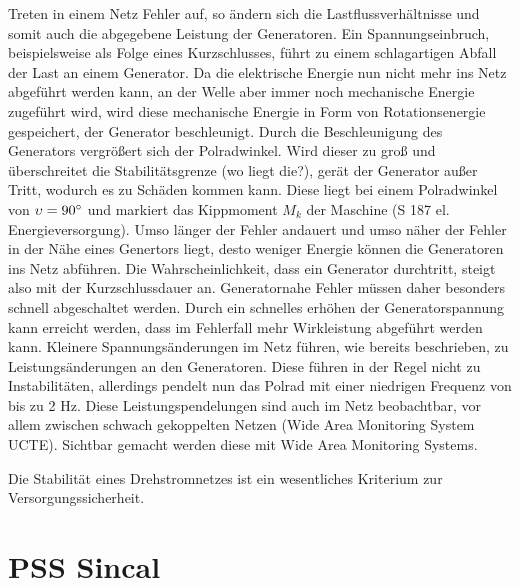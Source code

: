 \documentclass{scrartcl}
\begin{document}
\begin{onehalfspace}
Treten in einem Netz Fehler auf, so ändern sich die Lastflussverhältnisse und somit auch die abgegebene Leistung der Generatoren. Ein Spannungseinbruch, beispielsweise als Folge eines Kurzschlusses, führt zu einem schlagartigen Abfall der Last an einem Generator. Da die elektrische Energie nun nicht mehr ins Netz abgeführt werden kann, an der Welle aber immer noch mechanische Energie zugeführt wird, wird diese mechanische Energie in Form von Rotationsenergie gespeichert, der Generator beschleunigt. Durch die Beschleunigung des Generators vergrößert sich der Polradwinkel. Wird dieser zu groß und überschreitet die Stabilitätsgrenze (wo liegt die?), gerät der Generator \glqq außer Tritt\grqq, wodurch es zu Schäden kommen kann. Diese liegt bei einem Polradwinkel von $\upsilon = 90\degree$ und markiert das Kippmoment $M_k$ der Maschine (S 187 el. Energieversorgung). Umso länger der Fehler andauert und umso näher der Fehler in der Nähe eines Genertors liegt, desto weniger Energie können die Generatoren ins Netz abführen. Die Wahrscheinlichkeit, dass ein Generator \glqq durchtritt\grqq, steigt also mit der Kurzschlussdauer an. Generatornahe Fehler müssen daher besonders schnell abgeschaltet werden. Durch ein schnelles erhöhen der Generatorspannung kann erreicht werden, dass im Fehlerfall mehr Wirkleistung abgeführt werden kann. Kleinere Spannungsänderungen im Netz führen, wie bereits beschrieben, zu Leistungsänderungen an den Generatoren. Diese führen in der Regel nicht zu Instabilitäten, allerdings pendelt nun das Polrad mit einer niedrigen Frequenz von bis zu 2 Hz. Diese Leistungspendelungen sind auch im Netz beobachtbar, vor allem zwischen schwach gekoppelten Netzen (Wide Area Monitoring System UCTE). Sichtbar gemacht werden diese mit Wide Area Monitoring Systems.

Die Stabilität eines Drehstromnetzes ist ein wesentliches Kriterium zur Versorgungssicherheit.



\section{PSS Sincal}


\end{onehalfspace}
\end{document}
